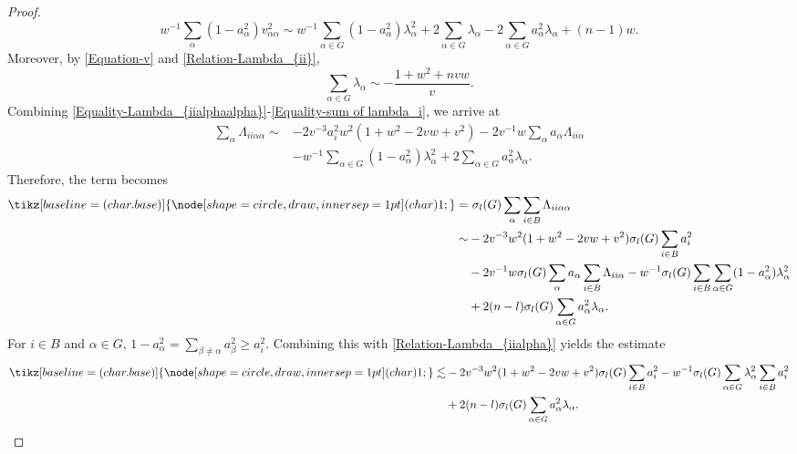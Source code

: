 \documentclass[11pt]{amsart}
\newcommand{\circled}[1]{
  \tikz[baseline=(char.base)]{
    \node[shape=circle,draw,inner sep=1pt] (char) {#1};
  }
}
\numberwithin{theorem}{section}
\numberwithin{equation}{section}
\begin{document}
\begin{proof}
\begin{equation}
w^{-1}\sum_\alpha(1-a_\alpha^2)v_{\alpha\alpha}^2
\sim w^{-1}\sum_{\alpha\in G}(1-a_\alpha^2)\lambda_\alpha^2+2\sum_{\alpha\in G}\lambda_\alpha-2\sum_{\alpha\in G}a_\alpha^2\lambda_\alpha+(n-1)w.
\end{equation}
Moreover, by \eqref{Equation-v} and \eqref{Relation-Lambda_{ii}},
\begin{equation}\label{Equality-sum of lambda_i}
\sum_{\alpha\in G}\lambda_\alpha\sim-\frac{1+w^2+nvw}{v}.
\end{equation}
Combining \eqref{Equality-Lambda_{iialphaalpha}}-\eqref{Equality-sum of lambda_i}, we arrive at
\begin{align*}
\sum_\alpha\Lambda_{ii\alpha\alpha}
\sim&-2v^{-3}a_i^2w^2(1+w^2-2vw+v^2)-2v^{-1}w\sum_\alpha a_\alpha\Lambda_{ii\alpha}\\
&-w^{-1}\sum_{\alpha\in G}(1-a_\alpha^2)\lambda_\alpha^2+2\sum_{\alpha\in G}a_\alpha^2\lambda_\alpha.
\end{align*}
Therefore, the term \circled{1} becomes
\begin{align*}
\circled{1}
=&~\sigma_l(G)\sum_\alpha\sum_{i\in B}\Lambda_{ii\alpha\alpha}\\
\sim&-2v^{-3}w^2(1+w^2-2vw+v^2)\sigma_l(G)\sum_{i\in B}a_i^2\\
&-2v^{-1}w\sigma_l(G)\sum_\alpha a_\alpha\sum_{i\in B}\Lambda_{ii\alpha}-w^{-1}\sigma_l(G)\sum_{i\in B}\sum_{\alpha\in G}(1-a_\alpha^2)\lambda_\alpha^2\\
&+2(n-l)\sigma_l(G)\sum_{\alpha\in G}a_\alpha^2\lambda_\alpha.
\end{align*}
For $i\in B$ and $\alpha\in G$, $1-a_\alpha^2=\sum_{\beta\neq\alpha}a_\beta^2\geq a_i^2$. Combining this with \eqref{Relation-Lambda_{iialpha}} yields the estimate
\begin{equation}\label{Estimate-1}
\begin{aligned}
\circled{1}
\lesssim&-2v^{-3}w^2(1+w^2-2vw+v^2)\sigma_l(G)\sum_{i\in B}a_i^2-w^{-1}\sigma_l(G)\sum_{\alpha\in G}\lambda_\alpha^2\sum_{i\in B}a_i^2\\
&+2(n-l)\sigma_l(G)\sum_{\alpha\in G}a_\alpha^2\lambda_\alpha.
\end{aligned}
\end{equation}


\end{proof}
\end{document}
